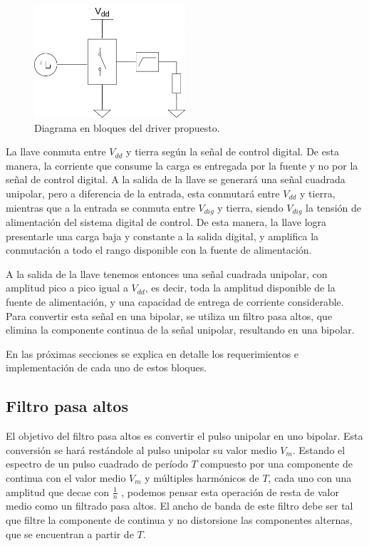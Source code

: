 \begin{figure}[tbp]
    \centering
    \includegraphics[width=0.5\textwidth]{images/driver.drawio.png}
    \caption{Diagrama en bloques del driver propuesto.}
    \label{fig:driver_block_diagram}
\end{figure}

La llave conmuta entre $V_{dd}$ y tierra según la señal de control digital. De
esta manera, la corriente que consume la carga es entregada por la fuente y no
por la señal de control digital. A la salida de la llave se generará una señal
cuadrada unipolar, pero a diferencia de la entrada, esta conmutará entre
$V_{dd}$ y tierra, mientras que a la entrada se conmuta entre $V_{dig}$ y
tierra, siendo $V_{dig}$ la tensión de alimentación del sistema digital de
control. De esta manera, la llave logra presentarle una carga baja y constante a
la salida digital, y amplifica la conmutación a todo el rango disponible con la
fuente de alimentación.

A la salida de la llave tenemos entonces una señal cuadrada unipolar, con
amplitud pico a pico igual a $V_{dd}$, es decir, toda la amplitud disponible de
la fuente de alimentación, y una capacidad de entrega de corriente considerable.
Para convertir esta señal en una bipolar, se utiliza un filtro pasa altos, que
elimina la componente continua de la señal unipolar, resultando en una bipolar.

En las próximas secciones se explica en detalle los requerimientos e
implementación de cada uno de estos bloques.

\subsection{Filtro pasa altos}

El objetivo del filtro pasa altos es convertir el pulso unipolar en uno bipolar.
Esta conversión se hará restándole al pulso unipolar su valor medio $V_m$.
Estando el espectro de un pulso cuadrado de período $T$ compuesto por una
componente de continua con el valor medio $V_{m}$ y múltiples harmónicos de $T$,
cada uno con una amplitud que decae con $\frac{1}{n}$ \cite{hsu1970analisis},
podemos pensar esta operación de resta de valor medio como un filtrado pasa
altos.  El ancho de banda de este filtro debe ser tal que filtre la componente
de continua y no distorsione las componentes alternas, que se encuentran a
partir de $T$.

